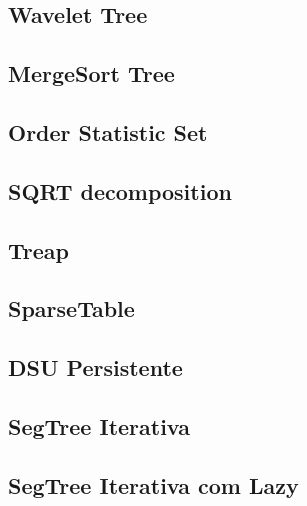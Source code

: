 \documentclass[12pt, a4paper, twoside]{article}
\begin{document}
\subsection{Wavelet Tree}


\subsection{MergeSort Tree}


\subsection{Order Statistic Set}


\subsection{SQRT decomposition}


\subsection{Treap}


\subsection{SparseTable}


\subsection{DSU Persistente}


\subsection{SegTree Iterativa}


\subsection{SegTree Iterativa com Lazy}

\end{document}
